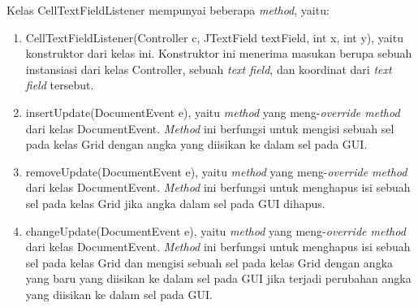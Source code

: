 Kelas CellTextFieldListener mempunyai beberapa \textit{method}, yaitu:

\begin{enumerate}
\item CellTextFieldListener(Controller c, JTextField textField, int x, int y), yaitu konstruktor dari kelas ini. Konstruktor ini menerima masukan berupa sebuah instansiasi dari kelas Controller, sebuah \textit{text field}, dan koordinat dari \textit{text field} tersebut.
\item insertUpdate(DocumentEvent e), yaitu \textit{method} yang meng-\textit{override method} dari kelas DocumentEvent. \textit{Method} ini berfungsi untuk mengisi sebuah sel pada kelas Grid dengan angka yang diisikan ke dalam sel pada GUI.
\item removeUpdate(DocumentEvent e), yaitu \textit{method} yang meng-\textit{override method} dari kelas DocumentEvent. \textit{Method} ini berfungsi untuk menghapus isi sebuah sel pada kelas Grid jika angka dalam sel pada GUI dihapus.
\item changeUpdate(DocumentEvent e), yaitu \textit{method} yang meng-\textit{override method} dari kelas DocumentEvent. \textit{Method} ini berfungsi untuk menghapus isi sebuah sel pada kelas Grid dan mengisi sebuah sel pada kelas Grid dengan angka yang baru yang diisikan ke dalam sel pada GUI jika terjadi perubahan angka yang diisikan ke dalam sel pada GUI.
\end{enumerate}